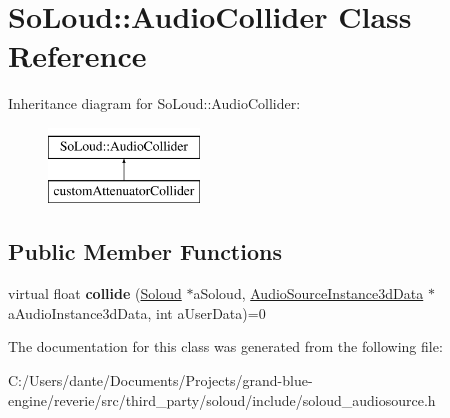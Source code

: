 \hypertarget{class_so_loud_1_1_audio_collider}{}\section{So\+Loud\+::Audio\+Collider Class Reference}
\label{class_so_loud_1_1_audio_collider}
Inheritance diagram for So\+Loud\+::Audio\+Collider\+:\begin{figure}[H]
\begin{center}
\leavevmode
\includegraphics[height=2.000000cm]{class_so_loud_1_1_audio_collider}
\end{center}
\end{figure}
\subsection*{Public Member Functions}
\begin{DoxyCompactItemize}
\item 
\mbox{\label{class_so_loud_1_1_audio_collider_afc4a1abeaa2a01d3df696c33a01c9eac}} 
virtual float {\bfseries collide} (\mbox{\hyperlink{class_so_loud_1_1_soloud}{Soloud}} $\ast$a\+Soloud, \mbox{\hyperlink{class_so_loud_1_1_audio_source_instance3d_data}{Audio\+Source\+Instance3d\+Data}} $\ast$a\+Audio\+Instance3d\+Data, int a\+User\+Data)=0
\end{DoxyCompactItemize}


The documentation for this class was generated from the following file\+:\begin{DoxyCompactItemize}
\item 
C\+:/\+Users/dante/\+Documents/\+Projects/grand-\/blue-\/engine/reverie/src/third\+\_\+party/soloud/include/soloud\+\_\+audiosource.\+h\end{DoxyCompactItemize}
